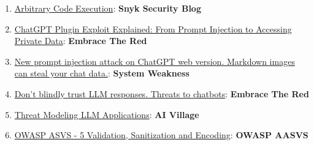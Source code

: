 \documentclass[
]{article}
\providecommand{\tightlist}{%
  \setlength{\itemsep}{0pt}\setlength{\parskip}{0pt}}
\begin{document}
\begin{enumerate}
\def\labelenumi{\arabic{enumi}.}
\tightlist
\item
  \href{https://security.snyk.io/vuln/SNYK-PYTHON-LANGCHAIN-5411357}{Arbitrary
  Code Execution}: \textbf{Snyk Security Blog}
\item
  \href{https://embracethered.com/blog/posts/2023/chatgpt-cross-plugin-request-forgery-and-prompt-injection./}{ChatGPT
  Plugin Exploit Explained: From Prompt Injection to Accessing Private
  Data}: \textbf{Embrace The Red}
\item
  \href{https://systemweakness.com/new-prompt-injection-attack-on-chatgpt-web-version-ef717492c5c2?gi=8daec85e2116}{New
  prompt injection attack on ChatGPT web version. Markdown images can
  steal your chat data.}: \textbf{System Weakness}
\item
  \href{https://embracethered.com/blog/posts/2023/ai-injections-threats-context-matters/}{Don't
  blindly trust LLM responses. Threats to chatbots}: \textbf{Embrace The
  Red}
\item
  \href{https://aivillage.org/large\%20language\%20models/threat-modeling-llm/}{Threat
  Modeling LLM Applications}: \textbf{AI Village}
\item
  \href{https://owasp-aasvs4.readthedocs.io/en/latest/V5.html\#validation-sanitization-and-encoding}{OWASP
  ASVS - 5 Validation, Sanitization and Encoding}: \textbf{OWASP AASVS}
\end{enumerate}
\end{document}
